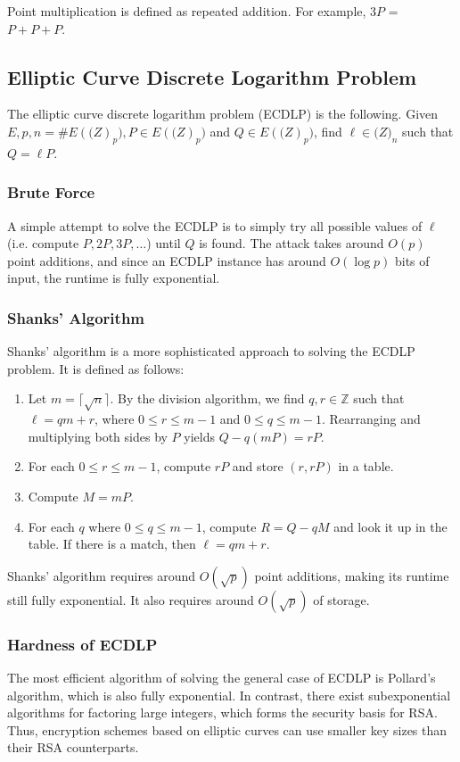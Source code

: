 \documentclass[12pt,titlepage]{article}
\begin{document}
        Point multiplication is defined as repeated addition. For example, $3 P$ = $P + P + P$.

    \subsection{Elliptic Curve Discrete Logarithm Problem}
      The elliptic curve discrete logarithm problem (ECDLP) is the following. Given $E, p, n = \#E(\mathbb(Z)_p), P \in E(\mathbb(Z)_p)$
      and $Q \in E(\mathbb(Z)_p)$, find $\ell \in \mathbb(Z)_n$ such that $Q = \ell P$.

      \subsubsection{Brute Force}
        A simple attempt to solve the ECDLP is to simply try all possible values of $\ell$ (i.e. compute $P, 2P, 3P, \dots$) until $Q$ is
        found. The attack takes around $O(p)$ point additions, and since an ECDLP instance has around $O(\log{p})$ bits of input, the runtime
        is fully exponential.

      \subsubsection{Shanks' Algorithm}
        Shanks' algorithm is a more sophisticated approach to solving the ECDLP problem. It is defined as follows:
        \begin{enumerate}
          \item Let $m = \lceil \sqrt{n} \rceil$. By the division algorithm, we find $q, r \in \mathbb{Z}$ such that $\ell = qm + r$, where
            $0 \leq r \leq m - 1$ and $0 \leq q \leq m - 1$. Rearranging and multiplying both sides by $P$ yields $Q - q(mP) = rP$.
          \item For each $0 \leq r \leq m - 1$, compute $rP$ and store $(r, rP)$ in a table.
          \item Compute $M = mP$.
          \item For each $q$ where $0 \leq q \leq m - 1$, compute $R = Q - qM$ and look it up in the table. If there is a match, then
            $\ell = qm + r$.
        \end{enumerate}

        Shanks' algorithm requires around $O(\sqrt{p})$ point additions, making its runtime still fully exponential. It also requires around
        $O(\sqrt{p})$ of storage.

      \subsubsection{Hardness of ECDLP}
        The most efficient algorithm of solving the general case of ECDLP is Pollard's algorithm, which is also fully exponential. In contrast,
        there exist subexponential algorithms for factoring large integers, which forms the security basis for RSA. Thus, encryption schemes based
        on elliptic curves can use smaller key sizes than their RSA counterparts.
\end{document}
